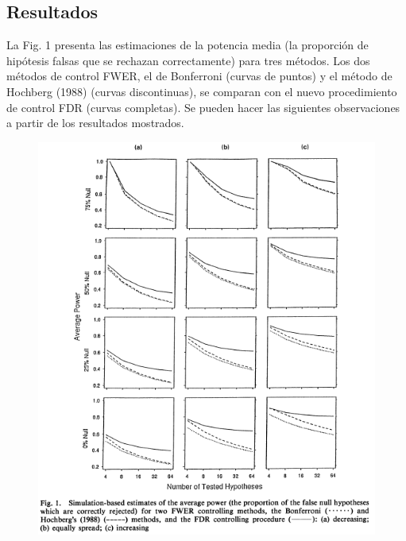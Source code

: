 \documentclass[11pt,letterpaper]{article}
\begin{document}
\subsection{Resultados}
La Fig. 1 presenta las estimaciones de la potencia media (la proporción de hipótesis falsas que se rechazan correctamente) para tres métodos. Los dos métodos de control FWER, el de Bonferroni (curvas de puntos) y el método de Hochberg (1988) (curvas discontinuas), se comparan con el nuevo procedimiento de control FDR (curvas completas). Se pueden hacer las siguientes observaciones a partir de los resultados mostrados. 
\begin{figure}[H]
\centering
\includegraphics[scale=.7]{figure_1.png}
\end{figure}
\end{document}
